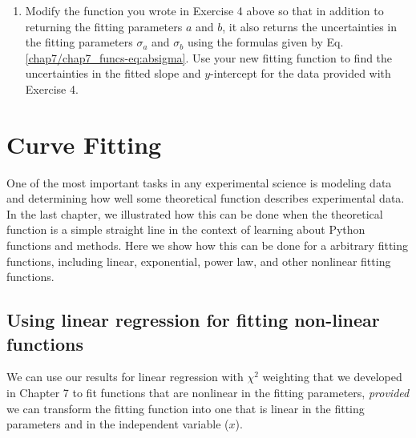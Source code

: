 \documentclass[letterpaper,10pt,english]{sphinxmanual}
\begin{document}
\begin{enumerate}
\begin{enumerate}
\end{enumerate}

\item {} 
Modify the function  you wrote in Exercise 4 above so that in addition to returning the fitting parameters \(a\) and \(b\), it also returns the uncertainties in the fitting parameters \(\sigma_a\) and \(\sigma_b\) using the formulas given by Eq. \eqref{chap7/chap7_funcs-eq:absigma}.  Use your new fitting function to find the uncertainties in the fitted slope and \(y\)-intercept for the data provided with Exercise 4.

\end{enumerate}


\chapter{Curve Fitting}
\label{chap8/chap8_fitting:index-0}\label{chap8/chap8_fitting::doc}\label{chap8/chap8_fitting:curve-fitting}\label{chap8/chap8_fitting:chap8}
One of the most important tasks in any experimental science is modeling data and determining how well some theoretical function describes experimental data.  In the last chapter, we illustrated how this can be done when the theoretical function is a simple straight line in the context of learning about Python functions and methods.  Here we show how this can be done for a arbitrary fitting functions, including linear, exponential, power law, and other nonlinear fitting functions.


\section{Using linear regression for fitting non-linear functions}
\label{chap8/chap8_fitting:using-linear-regression-for-fitting-non-linear-functions}
We can use our results for linear regression with \(\chi^2\) weighting that we developed in Chapter 7 to fit functions that are nonlinear in the fitting parameters, \emph{provided} we can transform the fitting function into one that is linear in the fitting parameters and in the independent variable (\(x\)).

\end{document}
